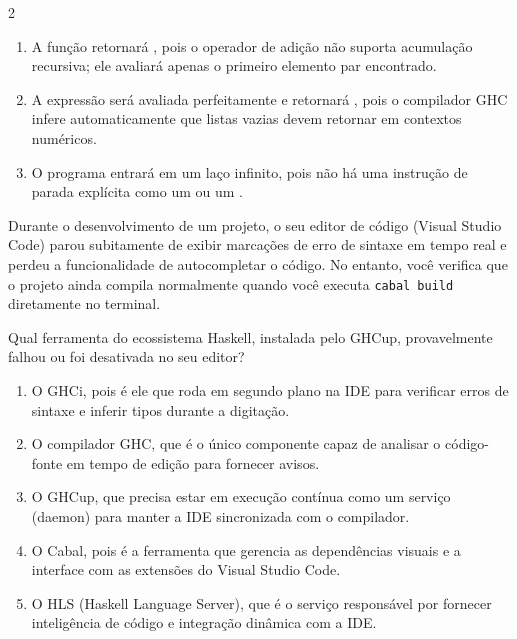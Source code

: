 \documentclass[a4paper,10pt,brazil]{article}
\begin{document}
\begin{multicols}{2}
\begin{enumerate}
  \item A função retornará , pois o operador de adição não suporta acumulação recursiva; ele avaliará apenas o primeiro elemento par encontrado.

  \item A expressão será avaliada perfeitamente e retornará , pois o compilador GHC infere automaticamente que listas vazias devem retornar  em contextos numéricos.

  \item O programa entrará em um laço infinito, pois não há uma instrução de parada explícita como um  ou um .


\end{enumerate}

Durante o desenvolvimento de um projeto, o seu editor de código (Visual Studio Code) parou subitamente de exibir marcações de erro de sintaxe em tempo real e perdeu a funcionalidade de autocompletar o código. No entanto, você verifica que o projeto ainda compila normalmente quando você executa \texttt{cabal build} diretamente no terminal. 

Qual ferramenta do ecossistema Haskell, instalada pelo GHCup, provavelmente falhou ou foi desativada no seu editor?

\begin{enumerate}
  \item O GHCi, pois é ele que roda em segundo plano na IDE para verificar erros de sintaxe e inferir tipos durante a digitação.

  \item O compilador GHC, que é o único componente capaz de analisar o código-fonte em tempo de edição para fornecer avisos.

  \item O GHCup, que precisa estar em execução contínua como um serviço (daemon) para manter a IDE sincronizada com o compilador.

  \item O Cabal, pois é a ferramenta que gerencia as dependências visuais e a interface com as extensões do Visual Studio Code.

  \item O HLS (Haskell Language Server), que é o serviço responsável por fornecer inteligência de código e integração dinâmica com a IDE.


\end{enumerate}


\end{multicols}
\end{document}
